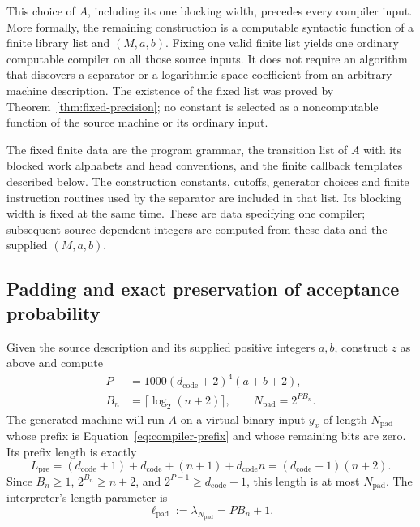 This choice of $A$, including its one blocking width, precedes every
compiler input.  More formally, the remaining construction is a
computable syntactic function of a finite library list and
$(M,a,b)$.  Fixing one valid finite list yields one ordinary
computable compiler on all those source inputs.  It does not require
an algorithm that discovers a separator or a logarithmic-space
coefficient from an arbitrary machine description.  The existence
of the fixed list was proved by Theorem~\ref{thm:fixed-precision};
no constant is selected as a noncomputable function of the source
machine or its ordinary input.

The fixed finite data are the program grammar, the transition list of
$A$ with its blocked work alphabets and head conventions, and the
finite callback templates described below. The construction constants,
cutoffs, generator choices and finite instruction routines used by the
separator are included in that list. Its blocking width is fixed at
the same time. These are data specifying one compiler; subsequent
source-dependent integers are computed from these data and the supplied
$(M,a,b)$.

\subsection{Padding and exact preservation of acceptance probability}
\label{subsec:compiler-padding}

Given the source description and its supplied positive integers $a,b$,
construct $z$ as above and compute
\begin{equation}\label{eq:compiler-padding}
 \begin{split}
 P&=1000(d_{\mathrm{code}}+2)^4(a+b+2),\\
 B_n&=\lceil\log_2(n+2)\rceil,
 \qquad N_{\mathrm{pad}}=2^{PB_n}.
 \end{split}
\end{equation}
The generated machine will run $A$ on a virtual binary input
$y_x$ of length $N_{\mathrm{pad}}$ whose prefix is
Equation~\eqref{eq:compiler-prefix} and whose remaining bits are zero.
Its prefix length is exactly
\begin{equation}\label{eq:compiler-prefix-length}
 L_{\mathrm{pre}}
 =(d_{\mathrm{code}}+1)+d_{\mathrm{code}}+(n+1)
       +d_{\mathrm{code}}n
 =(d_{\mathrm{code}}+1)(n+2).
\end{equation}
Since $B_n\ge1$, $2^{B_n}\ge n+2$, and
$2^{P-1}\ge d_{\mathrm{code}}+1$, this length is at most
$N_{\mathrm{pad}}$.  The interpreter's length parameter is
\begin{equation}\label{eq:compiler-padded-log}
 \ell_{\mathrm{pad}}
 :=\lambda_{N_{\mathrm{pad}}}=PB_n+1.
\end{equation}

